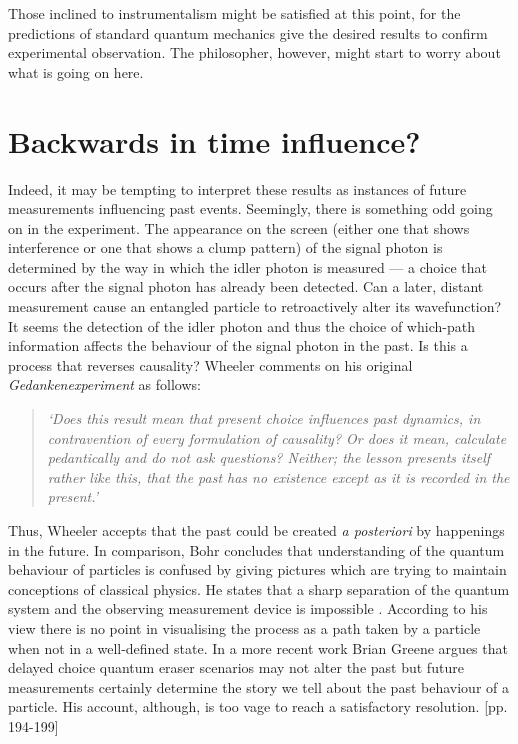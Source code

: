 \documentclass[12pt]{article}
\numberwithin{equation}{section}
\begin{document}
Those inclined to instrumentalism might be satisfied at this point, for the predictions of standard quantum mechanics give the desired results to confirm experimental observation. The philosopher, however, might start to worry about what is going on here. 

\section{Backwards in time influence?}
Indeed, it may be tempting to interpret these results as instances of future measurements influencing past events. Seemingly, there is something odd going on in the experiment. The appearance on the screen (either one that shows interference or one that shows a clump pattern) of the signal photon is determined by the way in which the idler photon is measured --- a choice that occurs after the signal photon has already been detected. Can a later, distant measurement cause an entangled particle to retroactively alter its wavefunction? It seems the detection of the idler photon and thus the choice of which-path information affects the behaviour of the signal photon in the past. Is this a process that reverses causality? Wheeler comments on his original \textit{Gedankenexperiment} as follows:
\begin{quote}
\textit{`Does this result mean that present choice influences past dynamics, in contravention of every formulation of causality? Or does it mean, calculate pedantically and do not ask questions? Neither; the lesson presents itself rather like this, that the past has no existence except as it is recorded in the present.'} \cite{wheeler1978past}
\end{quote}
Thus, Wheeler accepts that the past could be created \textit{a posteriori} by happenings in the future. In comparison, Bohr concludes that understanding of the quantum behaviour of particles is confused by giving pictures which are trying to maintain conceptions of classical physics. He states that a sharp separation of the quantum system and the observing measurement device is impossible \cite{bohr1961atomic}. According to his view there is no point in visualising the process as a path taken by a particle when not in a well-defined state.  In a more recent work Brian Greene argues that delayed choice quantum eraser scenarios may not alter the past but future measurements certainly determine the story we tell about the past behaviour of a particle. His account, although, is too vage to reach a satisfactory resolution.  \cite{brian2004fabric}[pp. 194-199] 
\end{document}
